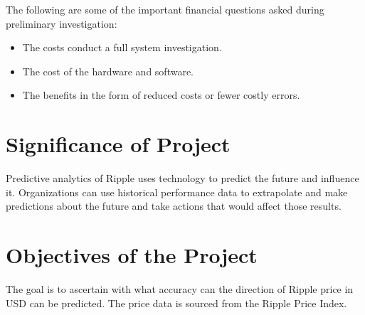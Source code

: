 The following are some of the important financial questions asked during preliminary investigation:
\begin{itemize}
	\item The costs conduct a full system investigation.
	\item The cost of the hardware and software.
	\item The benefits in the form of reduced costs or fewer costly errors.
\end{itemize}


\section{Significance of Project}
Predictive analytics of Ripple uses technology to predict the future and influence it. Organizations can use historical performance data to extrapolate and make predictions about the future and take actions that would affect those results.

\section{Objectives of the Project}
The goal is to ascertain with what accuracy can the direction of Ripple price in USD can be predicted. The price data is sourced from the Ripple Price Index.
